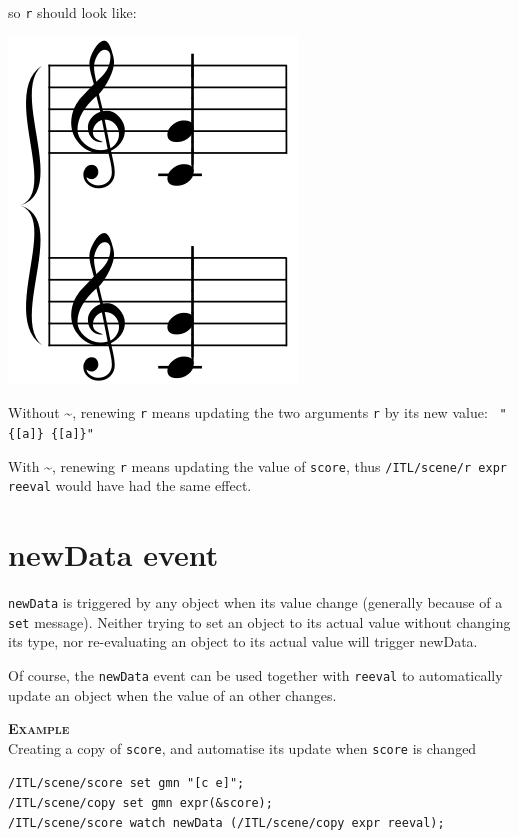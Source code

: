 \documentclass[a4paper,twoside]{report}
\newcommand{\sublevel}[1]	{\section{#1}}
\newcommand{\OSC}[1]		{\texttt{#1}}
\newcommand{\example}		{\textbf{\hspace{-1.5cm}\textbf{\textsc{Example }}}}
\newcommand{\lowTilde} 		{\textasciitilde}
\let\olditemize\itemize
\let\oldenditemize\enditemize
\renewenvironment{itemize} 	{\olditemize \setlength{\itemsep}{1mm}}{\oldenditemize}
\newcommand{\sample}	[1]			{\vspace{-2mm}\begin{center}\colorbox{mygrey}{
								\begin{minipage}[t]{0.9\columnwidth} 
								{\small \texttt{#1}}
								\end{minipage}}\end{center}}
\begin{document}
\begin{multicols}{2}
so \OSC{r} should look like:
\begin{center}
 \includegraphics[scale=0.3]{imgs/renewWith}
\end{center}
\end{multicols}

\begin{itemize}
\item Without \lowTilde, renewing \OSC{r} means updating the two arguments \OSC{r} by its new value: \OSC{ "\{[a]\} \{[a]\}" }
\item With \lowTilde, renewing \OSC{r} means updating the value of \OSC{score}, thus \OSC{/ITL/scene/r expr reeval} would have had the same effect.
\end{itemize}

\sublevel{newData event}

\OSC{newData} is triggered by any object when its value change (generally because of a \OSC{set} message). Neither trying to set an object to its actual value without changing its type, nor re-evaluating an object to its actual value will trigger newData.

Of course, the \OSC{newData} event can be used together with \OSC{reeval} to automatically update an object when the value of an other changes.

\example\\
Creating a copy of \OSC{score}, and automatise its update when \OSC{score} is changed
\sample{/ITL/scene/score set gmn "[c e]";\\
/ITL/scene/copy set gmn expr(\&score);\\
/ITL/scene/score watch newData (/ITL/scene/copy expr reeval);
}
\end{document}
